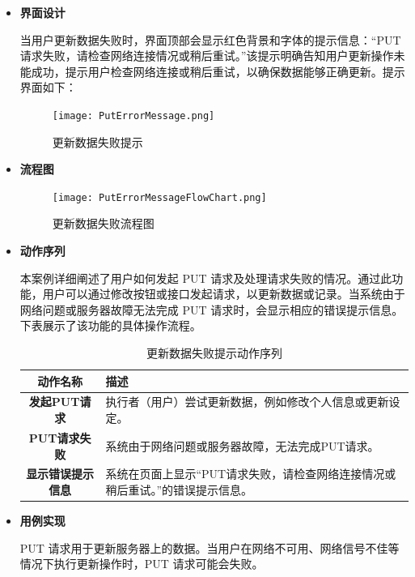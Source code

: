 \begin{itemize}
	
	\item \textbf{界面设计}
	
	当用户更新数据失败时，界面顶部会显示红色背景和字体的提示信息：“PUT请求失败，请检查网络连接情况或稍后重试。”该提示明确告知用户更新操作未能成功，提示用户检查网络连接或稍后重试，以确保数据能够正确更新。提示界面如下：
	
	\begin{figure}[H]
		\centering
		\texttt{[image: PutErrorMessage.png]}
		\caption{更新数据失败提示}
		\label{PutErrorMessage}
	\end{figure}	
	
	\item \textbf{流程图}
	
	\begin{figure}[H]
		\centering
		\texttt{[image: PutErrorMessageFlowChart.png]}
		\caption{更新数据失败流程图}
		\label{fig:put}
	\end{figure}	
	
	\item \textbf{动作序列}
	
	本案例详细阐述了用户如何发起 PUT 请求及处理请求失败的情况。通过此功能，用户可以通过修改按钮或接口发起请求，以更新数据或记录。当系统由于网络问题或服务器故障无法完成 PUT 请求时，会显示相应的错误提示信息。下表展示了该功能的具体操作流程。
	
	\begin{table}[H]
		\centering
		\caption{更新数据失败提示动作序列}
		\renewcommand\arraystretch{1.5}
		\begin{tabular}{|c|>{\raggedright\arraybackslash}p{10cm}|}
			\hline
			\textbf{动作名称} & \textbf{描述} \\ \hline
			\textbf{发起PUT请求} & 执行者（用户）尝试更新数据，例如修改个人信息或更新设定。 \\ \hline
			\textbf{PUT请求失败} & 系统由于网络问题或服务器故障，无法完成PUT请求。 \\ \hline
			\textbf{显示错误提示信息} & 系统在页面上显示“PUT请求失败，请检查网络连接情况或稍后重试。”的错误提示信息。 \\ \hline
		\end{tabular}
	\end{table}
	
	\item \textbf{用例实现}
	
	PUT 请求用于更新服务器上的数据。当用户在网络不可用、网络信号不佳等情况下执行更新操作时，PUT 请求可能会失败。
	

\end{itemize}
